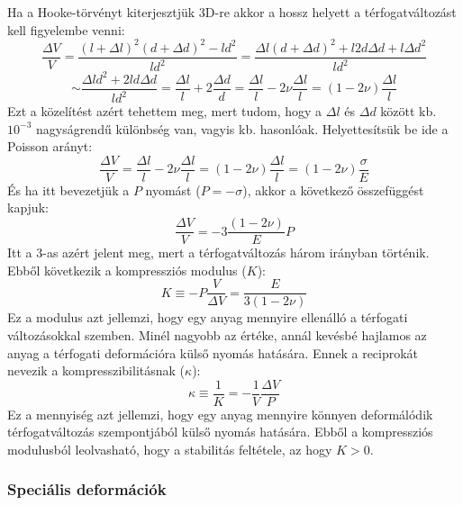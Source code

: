 \documentclass[../main.tex]{subfiles}
\begin{document}
Ha a Hooke-törvényt kiterjesztjük 3D-re akkor a hossz helyett a térfogatváltozást kell figyelembe venni:
\begin{equation}
    \frac{\Delta V}{V} = \frac{(l + \Delta l)^2 (d + \Delta d)^2 - ld^2}{ld^2} = \frac{\Delta l (d + \Delta d)^2 + l 2d \Delta d + l \Delta d^2}{ld^2}
\end{equation}
\begin{equation}
    \sim \frac{\Delta l d^2 + 2 l d \Delta d}{ld^2} = \frac{\Delta l}{l} + 2 \frac{\Delta d}{d} = \frac{\Delta l}{l} - 2 \nu \frac{\Delta l}{l} = (1 - 2 \nu) \frac{\Delta l}{l}
\end{equation}
Ezt a közelítést azért tehettem meg, mert tudom, hogy a $\Delta l$ és $\Delta d$ között kb. $10^{-3}$ nagyságrendű különbség van, vagyis kb. hasonlóak.
Helyettesítsük be ide a Poisson arányt:
\begin{equation}
    \frac{\Delta V}{V} = \frac{\Delta l}{l} - 2 \nu \frac{\Delta l}{l} = (1 - 2 \nu) \frac{\Delta l}{l} = (1 - 2 \nu) \frac{\sigma}{E}
\end{equation}
És ha itt bevezetjük a $P$ nyomást ($P = - \sigma$), akkor a következő összefüggést kapjuk:
\begin{equation}
    \frac{\Delta V}{V} = - 3 \frac{(1 - 2 \nu)}{E} P
\end{equation}
Itt a 3-as azért jelent meg, mert a térfogatváltozás három irányban történik. Ebből következik a kompressziós modulus ($K$):
\begin{equation}
    K \equiv - P \frac{V}{\Delta V} = \frac{E}{3(1 - 2 \nu)}
\end{equation}
Ez a modulus azt jellemzi, hogy egy anyag mennyire ellenálló a térfogati változásokkal szemben. Minél nagyobb az értéke, annál kevésbé hajlamos az anyag a térfogati deformációra külső nyomás hatására.
Ennek a reciprokát nevezik a kompresszibilitásnak ($\kappa$):
\begin{equation}
    \kappa \equiv \frac{1}{K} = - \frac{1}{V} \frac{\Delta V}{P}
\end{equation}
Ez a mennyiség azt jellemzi, hogy egy anyag mennyire könnyen deformálódik térfogatváltozás szempontjából külső nyomás hatására. Ebből a
kompressziós modulusból leolvasható, hogy a stabilitás feltétele, az hogy $K > 0$.

\subsubsection{Speciális deformációk}
\end{document}
